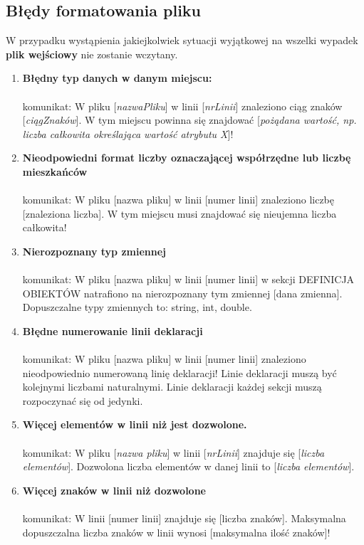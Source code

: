 \documentclass[hidelinks,10pt,a4paper]{article}
\newcommand\tab[1][0.5cm]{\hspace*{#1}}
\begin{document}
\subsection{Błędy formatowania pliku}
\tab W przypadku wystąpienia jakiejkolwiek sytuacji wyjątkowej na wszelki wypadek \textbf{plik wejściowy} nie zostanie wczytany.
\begin{enumerate} 

\item \textbf{Błędny typ danych w danym miejscu:}
\\
\\komunikat: W pliku [\textit{nazwaPliku}] w linii [\textit{nrLinii}] znaleziono ciąg znaków [\textit{ciągZnaków}]. W tym miejscu powinna się znajdować [\textit{pożądana wartość, np. liczba całkowita określająca wartość atrybutu X}]!

\item \textbf{Nieodpowiedni format liczby oznaczającej współrzędne lub liczbę mieszkańców}
\\\\komunikat: W pliku [nazwa pliku] w linii [numer linii] znaleziono liczbę [znaleziona liczba]. W tym miejscu musi znajdować się nieujemna liczba całkowita!

\item \textbf{Nierozpoznany typ zmiennej}
\\\\komunikat: W pliku [nazwa pliku] w linii [numer linii] w sekcji DEFINICJA OBIEKTÓW natrafiono na nierozpoznany tym zmiennej [dana zmienna]. Dopuszczalne typy zmiennych to: string, int, double.

\item \textbf{Błędne numerowanie linii deklaracji}
\\\\komunikat: W pliku [nazwa pliku] w linii [numer linii] znaleziono nieodpowiednio numerowaną linię deklaracji! Linie deklaracji muszą być kolejnymi liczbami naturalnymi. Linie deklaracji każdej sekcji muszą rozpoczynać się od jedynki.

\item \textbf{Więcej elementów w linii niż jest dozwolone.}
\\
\\komunikat: W pliku [\textit{nazwa pliku}] w linii [\textit{nrLinii}] znajduje się [\textit{liczba elementów}]. Dozwolona liczba elementów w danej linii to [\textit{liczba elementów}].

\item \textbf{Więcej znaków w linii niż dozwolone}
\\\\komunikat: W linii [numer linii] znajduje się [liczba znaków]. Maksymalna dopuszczalna liczba znaków w linii wynosi [maksymalna ilość znaków]!


\end{enumerate}
\end{document}
